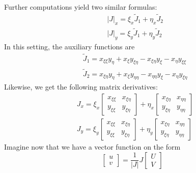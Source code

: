 \documentclass[final,1p,times]{elsarticle}
\begin{document}
Further computations yield two similar formulas:
\begin{subequations}
\begin{align}
&|J|_x = \xi_x\widetilde{J}_1+\eta_x\widetilde{J}_2 \\ 
&|J|_y = \xi_y\widetilde{J}_1+\eta_y\widetilde{J}_2
\end{align}
\end{subequations}
\clearpage\noindent
In this setting, the auxiliary functions are
\begin{subequations}
\begin{align}
&\widetilde{J}_1 = x_{\xi\xi}y_{\eta}+x_{\xi}y_{\xi\eta}-x_{\xi\eta}y_{\xi}-x_{\eta}y_{\xi\xi} \\
&\widetilde{J}_2 = x_{\xi\eta}y_{\eta}+x_{\xi}y_{\eta\eta}-x_{\eta\eta}y_{\xi}-x_{\eta}y_{\xi\eta}
\end{align}
\end{subequations}
Likewise, we get the following matrix derivatives:
\begin{subequations}
\begin{align}
&J_x = \xi_x\begin{bmatrix} x_{\xi\xi} & x_{\xi\eta} \\ y_{\xi\xi} & y_{\xi\eta} \end{bmatrix} + \eta_x\begin{bmatrix} x_{\xi\eta} & x_{\eta\eta} \\ y_{\xi\eta} & y_{\eta\eta} \end{bmatrix} \\
&J_y = \xi_y\begin{bmatrix} x_{\xi\xi} & x_{\xi\eta} \\ y_{\xi\xi} & y_{\xi\eta} \end{bmatrix} + \eta_y\begin{bmatrix} x_{\xi\eta} & x_{\eta\eta} \\ y_{\xi\eta} & y_{\eta\eta} \end{bmatrix}
\end{align}
\end{subequations}
Imagine now that we have a vector function on the form
\begin{equation*}
\begin{bmatrix} u \\ v \end{bmatrix} = \frac{1}{|J|}J\begin{bmatrix} U \\ V \end{bmatrix}
\end{equation*}
\end{document}
